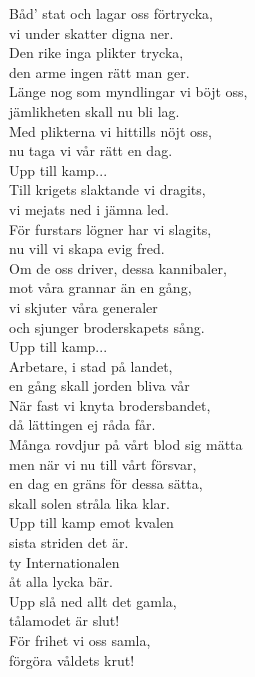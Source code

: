 \documentclass[a6paper, 10pt, twoside]{article}
\begin{document}
\begin{lyrics}
\newline
Båd' stat och lagar oss förtrycka, \\
vi under skatter digna ner. \\
Den rike inga plikter trycka, \\
den arme ingen rätt man ger. \\
Länge nog som myndlingar vi böjt oss, \\
jämlikheten skall nu bli lag. \\
Med plikterna vi hittills nöjt oss, \\
nu taga vi vår rätt en dag. \\
\newline
Upp till kamp... \\
\newline
Till krigets slaktande vi dragits, \\
vi mejats ned i jämna led. \\
För furstars lögner har vi slagits, \\
nu vill vi skapa evig fred. \\
Om de oss driver, dessa kannibaler, \\
mot våra grannar än en gång, \\
vi skjuter våra generaler \\
och sjunger broderskapets sång. \\
\newpage
\noindent
Upp till kamp... \\
\newline
Arbetare, i stad på landet, \\
en gång skall jorden bliva vår \\
När fast vi knyta brodersbandet, \\
då lättingen ej råda får. \\
Många rovdjur på vårt blod sig mätta \\
men när vi nu till vårt försvar, \\
en dag en gräns för dessa sätta, \\
skall solen stråla lika klar. \\
\newline
Upp till kamp emot kvalen \\
sista striden det är. \\
ty Internationalen \\
åt alla lycka bär. \\
Upp slå ned allt det gamla,\\
tålamodet är slut!\\
För frihet vi oss samla,\\
förgöra våldets krut!
\end{lyrics}
\end{document}
